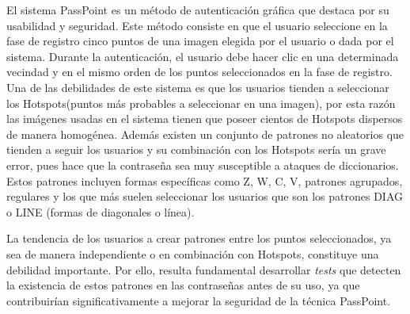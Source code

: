 \documentclass[12pt]{report}
\begin{document}
	El sistema PassPoint\cite{1} es un método de autenticación gráfica que destaca por su usabilidad y seguridad. Este método consiste  en que el usuario seleccione en la fase de registro  cinco puntos de una imagen elegida por el usuario o dada por el sistema. Durante la autenticación, el usuario debe hacer clic en una determinada vecindad y en el mismo orden de los puntos seleccionados en la fase de  registro. Una de las debilidades de este sistema es que los usuarios tienden a seleccionar los Hotspots\cite{4}(puntos más probables a seleccionar en una imagen), por esta razón las imágenes usadas en el sistema tienen que poseer cientos de Hotspots dispersos de manera homogénea. Además existen un conjunto de patrones no aleatorios que tienden a seguir los usuarios y su combinación con los Hotspots sería un grave error, pues hace que la contraseña sea muy susceptible a ataques de diccionarios. Estos patrones incluyen formas específicas como Z, W, C, V, patrones agrupados, regulares y los que más suelen seleccionar los usuarios  que son los  patrones DIAG o LINE (formas de diagonales o línea)\cite{5}.
	
	
	La tendencia de los usuarios a crear patrones entre los puntos seleccionados, ya sea de manera independiente o en combinación con Hotspots, constituye una debilidad importante. Por ello, resulta fundamental desarrollar \textit{tests} que detecten la existencia de estos patrones en las contraseñas antes de su uso, ya que contribuirían significativamente a mejorar la seguridad de la técnica PassPoint.
	
	
\end{document}
